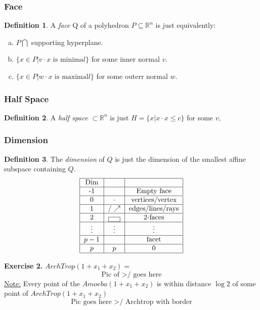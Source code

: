 \documentclass[]{article}
\theoremstyle{definition}
\newtheorem*{defn}{Definition}
\begin{document}
			\subsubsection{Face}
			\begin{defn}
			A \emph{face} Q of a polyhedron $P \subseteq \mathbb{R}^n$ is just equivalently:
			\begin{enumerate}[(a)]
			\item $P \bigcap $ supporting hyperplane.
			\item $\{x \in P | v\cdot x \text{ is minima}l\}$ for some inner normal $v$. 
			\item $\{x \in P | w\cdot x \text{ is maximal}l\}$ for some outerr normal $w$.
			\end{enumerate}
			\end{defn}
			\subsubsection{Half Space}
			\begin{defn}
			A \emph{half space} $\subset\mathbb{R}^n$ is just
			$H=\{x | x\cdot x \leq c\}$
			for some $v$,
			\end{defn}
			\subsubsection{Dimension}
			\begin{defn}
			The \emph{dimension} of $Q$ is just the dimension of the smallest affine subspace containing $Q$.
			\[
			\begin{tabular}{|c|c|c|}\hline Dim &  &  \\\hline -1 & $\empty$ & Empty face \\\hline 0 & $\cdot$ & vertices/vertex \\\hline 1 & $ / \nearrow$  & edges/lines/rays \\\hline 2 & \framebox{\quad } & 2-faces \\\hline $\vdots$ & $\vdots$ & $\vdots$ \\\hline $p-1$ &  & facet \\\hline $p$ & $p$& 0 \\\hline \end{tabular}\]
			\end{defn}
			\textbf{Exercise 2.}
			$ArchTrop(1+x_1+x_2)=$
			\[ \text{Pic of >/  goes here} \]
			\underline{Note:} Every point of the $Amoeba(1+x_1+x_2)$ is within distance $\log2$ of some point of $ArchTrop(1+x_1+x_2)$
			\[\text{Pic goes here >/ Archtrop with border}\]
\end{document}
